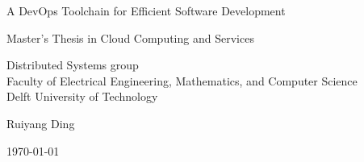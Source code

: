 \begin{titlepage}

  \begin{center}
  \null\vfill
    \begin{center}
    \LARGE{A DevOps Toolchain for Efficient Software Development}
    \end{center}

    \vspace{3cm}

    \begin{large}
    Master's Thesis in Cloud Computing and Services
    \end{large}

    \vspace{1.5cm}

    \begin{normalsize}
    Distributed Systems group\\
    Faculty of Electrical Engineering, Mathematics, and Computer Science\\
    Delft University of Technology
    \end{normalsize}

    \vspace{2.0cm}

    \begin{normalsize}
Ruiyang Ding
    \end{normalsize}

    \vspace{1.0cm}

    \today            %

  \vfill
  \end{center}

\end{titlepage}

